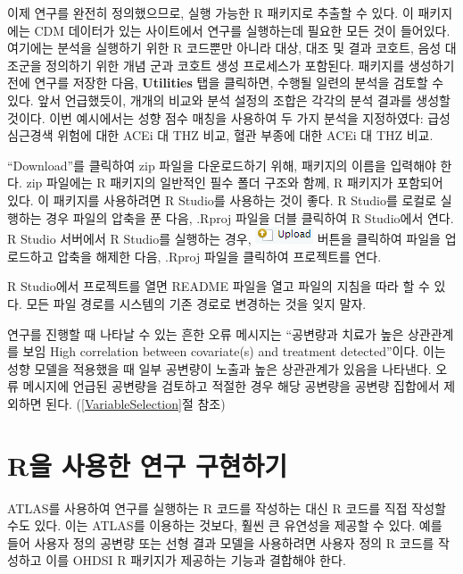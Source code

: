\documentclass[11pt]{book}
\theoremstyle{definition}
\theoremstyle{definition}
\theoremstyle{definition}
\theoremstyle{remark}
\begin{document}
이제 연구를 완전히 정의했으므로, 실행 가능한 R 패키지로 추출할 수 있다.
이 패키지에는 CDM 데이터가 있는 사이트에서 연구를 실행하는데 필요한 모든
것이 들어있다. 여기에는 분석을 실행하기 위한 R 코드뿐만 아니라 대상,
대조 및 결과 코호트, 음성 대조군을 정의하기 위한 개념 군과 코호트 생성
프로세스가 포함된다. 패키지를 생성하기 전에 연구를 저장한 다음,
\textbf{Utilities} 탭을 클릭하면, 수행될 일련의 분석을 검토할 수 있다.
앞서 언급했듯이, 개개의 비교와 분석 설정의 조합은 각각의 분석 결과를
생성할 것이다. 이번 예시에서는 성향 점수 매칭을 사용하여 두 가지 분석을
지정하였다: 급성 심근경색 위험에 대한 ACEi 대 THZ 비교, 혈관 부종에 대한
ACEi 대 THZ 비교.

``Download''를 클릭하여 zip 파일을 다운로드하기 위해, 패키지의 이름을
입력해야 한다. zip 파일에는 R 패키지의 일반적인 필수 폴더 구조와 함께, R
패키지가 포함되어 있다. \citep{Wickham_2015} 이 패키지를 사용하려면 R
Studio를 사용하는 것이 좋다. R Studio를 로컬로 실행하는 경우 파일의
압축을 푼 다음, .Rproj 파일을 더블 클릭하여 R Studio에서 연다. R Studio
서버에서 R Studio를 실행하는 경우,
\includegraphics{images/PopulationLevelEstimation/upload.png} 버튼을
클릭하여 파일을 업로드하고 압축을 해제한 다음, .Rproj 파일을 클릭하여
프로젝트를 연다.

R Studio에서 프로젝트를 열면 README 파일을 열고 파일의 지침을 따라 할 수
있다. 모든 파일 경로를 시스템의 기존 경로로 변경하는 것을 잊지 말자.

연구를 진행할 때 나타날 수 있는 흔한 오류 메시지는 ``공변량과 치료가
높은 상관관계를 보임 High correlation between covariate(s) and treatment
detected''이다. 이는 성향 모델을 적용했을 때 일부 공변량이 노출과 높은
상관관계가 있음을 나타낸다. 오류 메시지에 언급된 공변량을 검토하고
적절한 경우 해당 공변량을 공변량 집합에서 제외하면 된다.
(\ref{VariableSelection}절 참조) 

\section{R을 사용한 연구 구현하기}\label{pleR}

ATLAS를 사용하여 연구를 실행하는 R 코드를 작성하는 대신 R 코드를 직접
작성할 수도 있다. 이는 ATLAS를 이용하는 것보다, 훨씬 큰 유연성을 제공할
수 있다. 예를 들어 사용자 정의 공변량 또는 선형 결과 모델을 사용하려면
사용자 정의 R 코드를 작성하고 이를 OHDSI R 패키지가 제공하는 기능과
결합해야 한다.
\end{document}
